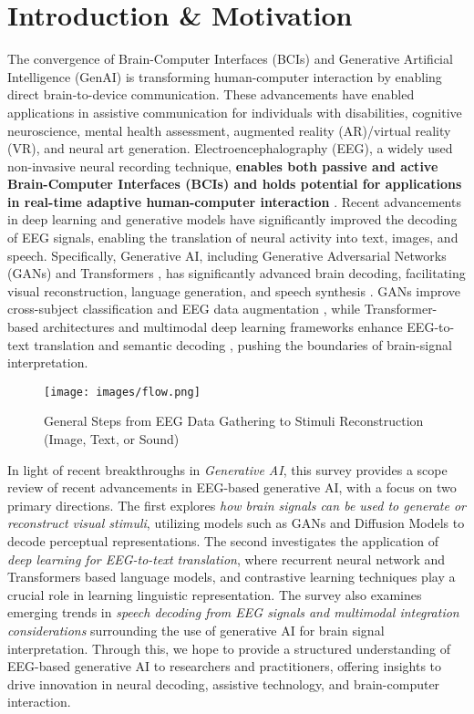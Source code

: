 \section{Introduction \& Motivation}
\label{sec:intro}
The convergence of Brain-Computer Interfaces (BCIs) and Generative Artificial Intelligence (GenAI) is transforming human-computer interaction by enabling direct brain-to-device communication. These advancements have enabled applications in assistive communication for individuals with disabilities, cognitive neuroscience, mental health assessment, augmented reality (AR)/virtual reality (VR), and neural art generation. Electroencephalography (EEG), a widely used non-invasive neural recording technique, \textbf{enables both passive and active Brain-Computer Interfaces (BCIs) and holds potential for applications in real-time adaptive human-computer interaction} \cite{zander2010enhancing, wolpaw2010brain}. Recent advancements in deep learning and generative models have significantly improved the decoding of EEG signals, enabling the translation of neural activity into text, images, and speech. Specifically, Generative AI, including Generative Adversarial Networks (GANs) \cite{goodfellow2014generative} and Transformers \cite{vaswani2017attention}, has significantly advanced brain decoding, facilitating visual reconstruction, language generation, and speech synthesis \cite{bai2306dreamdiffusion, srivastava2020think2type, lee2023towards}. GANs improve cross-subject classification and EEG data augmentation \cite{song2021common}, while Transformer-based architectures and multimodal deep learning frameworks \cite{liu2024eeg2text,wang2022open} enhance EEG-to-text translation and semantic decoding \cite{ali2024get}, pushing the boundaries of brain-signal interpretation.

\begin{figure*}[t]
     \centering
    {\texttt{[image: images/flow.png]}}
   \caption{General Steps from EEG Data Gathering to Stimuli Reconstruction (Image, Text, or Sound)}
	\label{fig:overall}
\end{figure*}


In light of recent breakthroughs in \emph{Generative AI}, this survey provides a scope review of recent advancements in EEG-based generative AI, with a focus on two primary  directions. The first explores \emph{how brain signals can be used to generate or reconstruct visual stimuli}, utilizing models such as GANs and Diffusion Models to decode perceptual representations. The second investigates the application of \emph{deep learning for EEG-to-text translation}, where recurrent neural network and Transformers \cite{vaswani2017attention} based language models, and contrastive learning techniques play a crucial role in learning linguistic representation. The survey also examines emerging trends in \emph{speech decoding from EEG signals and multimodal integration considerations} surrounding the use of generative AI for brain signal interpretation. Through this, we hope to provide a structured understanding of EEG-based generative AI to researchers and practitioners, offering insights to drive innovation in neural decoding, assistive technology, and brain-computer interaction.

